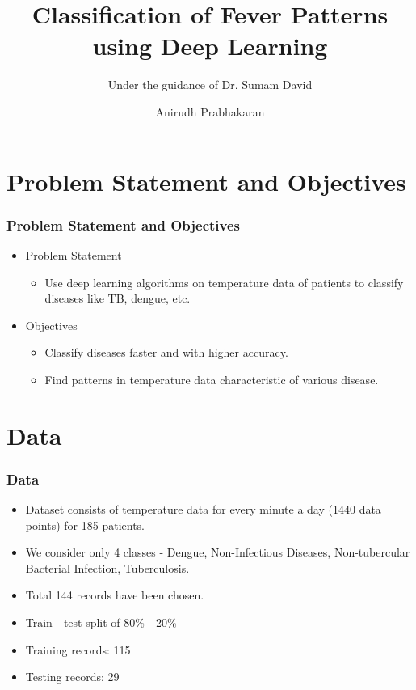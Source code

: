 \documentclass[pdf, 9pt]{beamer}
\title{Classification of Fever Patterns using Deep Learning}
\subtitle{Under the guidance of Dr. Sumam David}
\author{Anirudh Prabhakaran}
\institute{National Institute of Technology, Karnataka}
\begin{document}
	
	\begin{frame}
		\titlepage
	\end{frame}
	
	\section{Problem Statement and Objectives}
	\begin{frame}
		\frametitle{Problem Statement and Objectives}
		\begin{itemize}
			\item Problem Statement
			\begin{itemize}
				\item Use deep learning algorithms on temperature data of patients to classify diseases like TB, dengue, etc.
			\end{itemize}
			\item Objectives
			\begin{itemize}
				\item Classify diseases faster and with higher accuracy.
				\item Find patterns in temperature data characteristic of various disease.
			\end{itemize}
		\end{itemize}
	\end{frame}
	
	\section{Data}
	\begin{frame}
		\frametitle{Data}
		\begin{itemize}
			\item Dataset consists of temperature data for every minute a day (1440 data points) for 185 patients.
			\item We consider only 4 classes - Dengue, Non-Infectious Diseases, Non-tubercular Bacterial Infection, Tuberculosis.
			\item Total 144 records have been chosen.
			\item Train - test split of 80\% - 20\%
			\item Training records: 115
			\item Testing records: 29
		\end{itemize}
	\end{frame}
	
\end{document}
